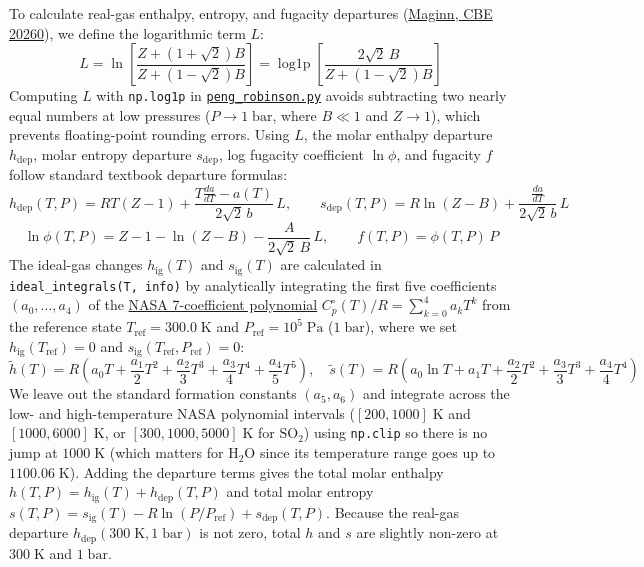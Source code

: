 \documentclass[10pt,a4paper]{article}
\begin{document}
To calculate real-gas enthalpy, entropy, and fugacity departures (\href{https://ejmaginn.github.io/CBE20260-notes/class34/fugacity-EOS.html}{Maginn, CBE 20260}), we define the logarithmic term $L$:
\begin{equation}
L = \ln\!\left[\frac{Z + (1 + \sqrt{2})B}{Z + (1 - \sqrt{2})B}\right] = \operatorname{log1p}\!\left[\frac{2\sqrt{2}\,B}{Z + (1 - \sqrt{2})B}\right]
\label{eq:log_factor}
\end{equation}
Computing $L$ with \texttt{np.log1p} in \href{https://github.com/satwikgupta122/realgas_ml/blob/main/realgas_ml/peng_robinson.py}{\texttt{peng\_robinson.py}} avoids subtracting two nearly equal numbers at low pressures ($P \to 1\;\mathrm{bar}$, where $B \ll 1$ and $Z \to 1$), which prevents floating-point rounding errors. Using $L$, the molar enthalpy departure $h_{\mathrm{dep}}$, molar entropy departure $s_{\mathrm{dep}}$, log fugacity coefficient $\ln\phi$, and fugacity $f$ follow standard textbook departure formulas:
\begin{equation}
h_{\mathrm{dep}}(T,P) = RT(Z - 1) + \frac{T\frac{da}{dT} - a(T)}{2\sqrt{2}\,b}\,L, \qquad
s_{\mathrm{dep}}(T,P) = R\ln(Z - B) + \frac{\frac{da}{dT}}{2\sqrt{2}\,b}\,L
\label{eq:hs_dep}
\end{equation}
\begin{equation}
\ln\phi(T,P) = Z - 1 - \ln(Z - B) - \frac{A}{2\sqrt{2}\,B}\,L, \qquad f(T,P) = \phi(T,P)\,P
\label{eq:fugacity}
\end{equation}
The ideal-gas changes $h_{\mathrm{ig}}(T)$ and $s_{\mathrm{ig}}(T)$ are calculated in \texttt{ideal\_integrals(T, info)} by analytically integrating the first five coefficients $(a_0,\dots,a_4)$ of the \href{https://www.cantera.org/stable/reference/thermo/species-thermo.html}{NASA 7-coefficient polynomial} $C_p^\circ(T)/R = \sum_{k=0}^4 a_k T^k$ from the reference state $T_{\mathrm{ref}} = 300.0\;\mathrm{K}$ and $P_{\mathrm{ref}} = 10^5\;\mathrm{Pa}$ ($1\;\mathrm{bar}$), where we set $h_{\mathrm{ig}}(T_{\mathrm{ref}}) = 0$ and $s_{\mathrm{ig}}(T_{\mathrm{ref}}, P_{\mathrm{ref}}) = 0$:
\begin{equation}
\tilde{h}(T) = R\!\left(a_0 T + \frac{a_1}{2}T^2 + \frac{a_2}{3}T^3 + \frac{a_3}{4}T^4 + \frac{a_4}{5}T^5\right), \quad
\tilde{s}(T) = R\!\left(a_0 \ln T + a_1 T + \frac{a_2}{2}T^2 + \frac{a_3}{3}T^3 + \frac{a_4}{4}T^4\right)
\label{eq:nasa7}
\end{equation}
We leave out the standard formation constants $(a_5, a_6)$ and integrate across the low- and high-temperature NASA polynomial intervals ($[200, 1000]\;\mathrm{K}$ and $[1000, 6000]\;\mathrm{K}$, or $[300, 1000, 5000]\;\mathrm{K}$ for $\mathrm{SO_2}$) using \texttt{np.clip} so there is no jump at $1000\;\mathrm{K}$ (which matters for $\mathrm{H_2O}$ since its temperature range goes up to $1100.06\;\mathrm{K}$). Adding the departure terms gives the total molar enthalpy $h(T,P) = h_{\mathrm{ig}}(T) + h_{\mathrm{dep}}(T,P)$ and total molar entropy $s(T,P) = s_{\mathrm{ig}}(T) - R\ln(P/P_{\mathrm{ref}}) + s_{\mathrm{dep}}(T,P)$. Because the real-gas departure $h_{\mathrm{dep}}(300\;\mathrm{K}, 1\;\mathrm{bar})$ is not zero, total $h$ and $s$ are slightly non-zero at $300\;\mathrm{K}$ and $1\;\mathrm{bar}$.
\end{document}
